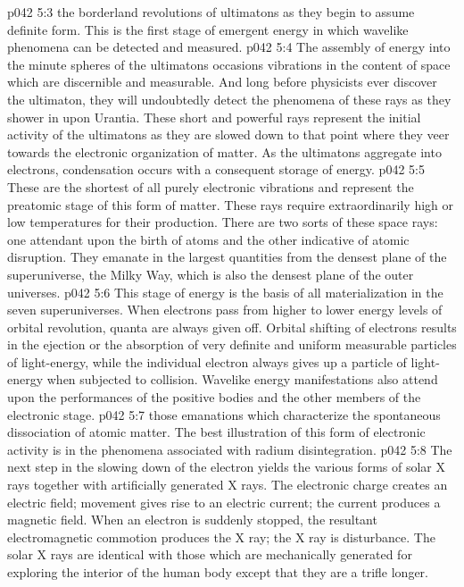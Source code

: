 \vs p042 5:3 \bibnobreakspace {} the borderland revolutions of ultimatons as they begin to assume definite form. This is the first stage of emergent energy in which wavelike phenomena can be detected and measured.
\vs p042 5:4 \pc {}\bibnobreakspace {} The assembly of energy into the minute spheres of the ultimatons occasions vibrations in the content of space which are discernible and measurable. And long before physicists ever discover the ultimaton, they will undoubtedly detect the phenomena of these rays as they shower in upon Urantia. These short and powerful rays represent the initial activity of the ultimatons as they are slowed down to that point where they veer towards the electronic organization of matter. As the ultimatons aggregate into electrons, condensation occurs with a consequent storage of energy.
\vs p042 5:5 \pc {}\bibnobreakspace {} These are the shortest of all purely electronic vibrations and represent the preatomic stage of this form of matter. These rays require extraordinarily high or low temperatures for their production. There are two sorts of these space rays: one attendant upon the birth of atoms and the other indicative of atomic disruption. They emanate in the largest quantities from the densest plane of the superuniverse, the Milky Way, which is also the densest plane of the outer universes.
\vs p042 5:6 \pc {}\bibnobreakspace {} This stage of energy is the basis of all materialization in the seven superuniverses. When electrons pass from higher to lower energy levels of orbital revolution, quanta are always given off. Orbital shifting of electrons results in the ejection or the absorption of very definite and uniform measurable particles of light\hyp{}energy, while the individual electron always gives up a particle of light\hyp{}energy when subjected to collision. Wavelike energy manifestations also attend upon the performances of the positive bodies and the other members of the electronic stage.
\vs p042 5:7 \pc {}\bibnobreakspace {} those emanations which characterize the spontaneous dissociation of atomic matter. The best illustration of this form of electronic activity is in the phenomena associated with radium disintegration.
\vs p042 5:8 \pc {}\bibnobreakspace {} The next step in the slowing down of the electron yields the various forms of solar X rays together with artificially generated X rays. The electronic charge creates an electric field; movement gives rise to an electric current; the current produces a magnetic field. When an electron is suddenly stopped, the resultant electromagnetic commotion produces the X ray; the X ray is  disturbance. The solar X rays are identical with those which are mechanically generated for exploring the interior of the human body except that they are a trifle longer.
